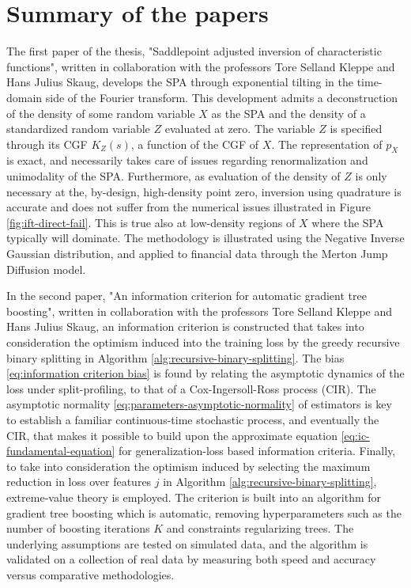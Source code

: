 \chapter{Summary of the papers}

The first paper of the thesis, "Saddlepoint adjusted inversion of characteristic functions", written in collaboration with the professors Tore Selland Kleppe and Hans Julius Skaug, develops the SPA through exponential tilting in the time-domain side of the Fourier transform. 
This development admits a deconstruction of the density of some random variable $X$ as the SPA and the density of a standardized random variable $Z$ evaluated at zero. The variable $Z$ is specified through its CGF $K_Z(s)$, a function of the CGF of $X$.
The representation of $p_X$ is exact, and necessarily takes care of issues regarding renormalization and unimodality of the SPA.
Furthermore, as evaluation of the density of $Z$ is only necessary at the, by-design, high-density point zero, inversion using quadrature is accurate and does not suffer from the numerical issues illustrated in Figure \ref{fig:ift-direct-fail}. This is true also at low-density regions of $X$ where the SPA typically will dominate.
The methodology is illustrated using the Negative Inverse Gaussian distribution, and applied to financial data through the Merton Jump Diffusion model.


In the second paper, "An information criterion for automatic gradient tree boosting", written in collaboration with the professors Tore Selland Kleppe and Hans Julius Skaug, an information criterion is constructed that takes into consideration the optimism induced into the training loss by the greedy recursive binary splitting in Algorithm \ref{alg:recursive-binary-splitting}.
The bias \eqref{eq:information criterion bias} is found by relating the asymptotic dynamics of the loss under split-profiling, to that of a Cox-Ingersoll-Ross process (CIR).
The asymptotic normality \eqref{eq:parameters-asymptotic-normality} of estimators is key to establish a familiar continuous-time stochastic process, and eventually the CIR, that makes it possible to build upon the approximate equation \eqref{eq:ic-fundamental-equation} for generalization-loss based information criteria.
Finally, to take into consideration the optimism induced by selecting the maximum reduction in loss over features $j$ in Algorithm \ref{alg:recursive-binary-splitting}, extreme-value theory is employed.
The criterion is built into an algorithm for gradient tree boosting which is automatic, removing hyperparameters such as the number of boosting iterations $K$ and constraints regularizing trees.
The underlying assumptions are tested on simulated data, and the algorithm is validated on a collection of real data by measuring both speed and accuracy versus comparative methodologies.


